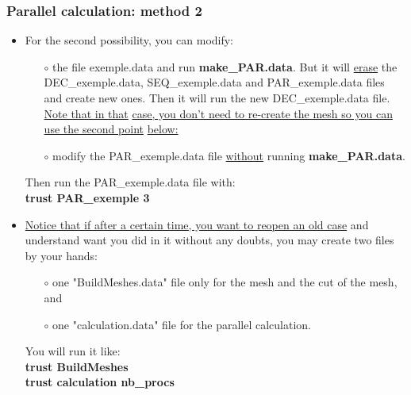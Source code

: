 \documentclass[10pt]{beamer}
\begin{document}
\begin{frame}
\frametitle{Parallel calculation: method 2}
\begin{block}{}

\begin{itemize}
\item For the second possibility, you can modify:
    \begin{itemize} 
    \item [$\circ$] the file exemple.data and run \textbf{make\_PAR.data}. But it will \underline{erase} the DEC\_exemple.data, SEQ\_exemple.data and PAR\_exemple.data files and create new ones. Then it will run the new DEC\_exemple.data file. \underline{Note that in that} \underline{case, you don't need to re-create the mesh so you can use the second point} \underline{below:}
    \item [$\circ$] modify the PAR\_exemple.data file \underline{without} running \textbf{make\_PAR.data}.
    \end{itemize}
Then run the PAR\_exemple.data file with:\\
\textbf{trust PAR\_exemple 3}

\item \underline{Notice that if after a certain time, you want to reopen an old case} and understand want you did in it without any doubts, you may create two files by your hands:
    \begin{itemize} 
    \item [$\circ$] one "BuildMeshes.data" file only for the mesh and the cut of the mesh, and
    \item [$\circ$] one "calculation.data" file for the parallel calculation. 
    \end{itemize}
You will run it like:\\
\textbf{trust BuildMeshes}\\
\textbf{trust calculation nb\_procs}\\
\end{itemize}

\end{block}
\end{frame}
\end{document}
